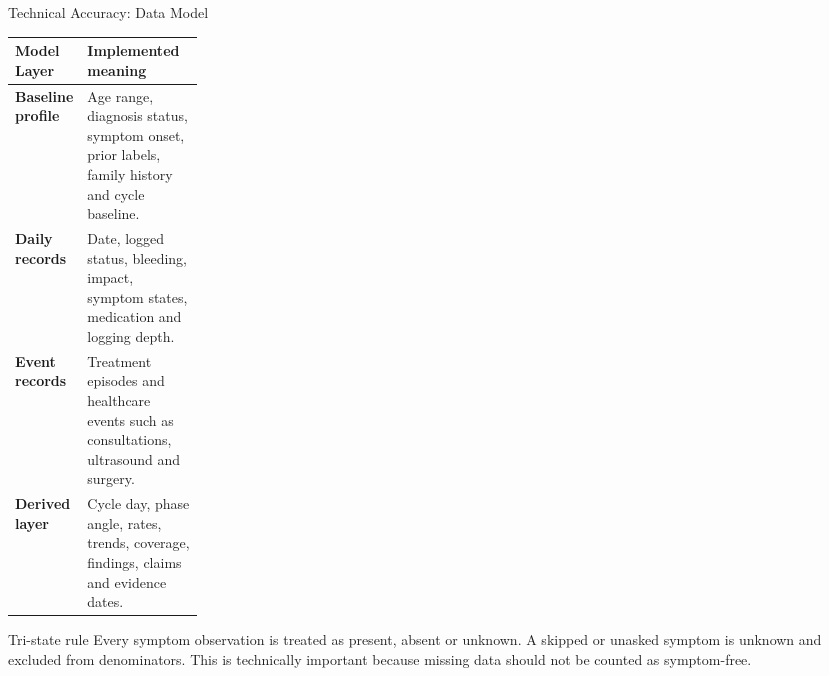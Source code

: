 \documentclass[aspectratio=169,11pt]{beamer}
\begin{document}
\begin{frame}{Technical Accuracy: Data Model}
  \small
  \begin{tabularx}{\linewidth}{>{\bfseries}p{0.22\linewidth} X}
    \toprule
    Model Layer & Implemented meaning \\
    \midrule
    Baseline profile & Age range, diagnosis status, symptom onset, prior labels, family history and cycle baseline. \\
    Daily records & Date, logged status, bleeding, impact, symptom states, medication and logging depth. \\
    Event records & Treatment episodes and healthcare events such as consultations, ultrasound and surgery. \\
    Derived layer & Cycle day, phase angle, rates, trends, coverage, findings, claims and evidence dates. \\
    \bottomrule
  \end{tabularx}

  \vspace{4mm}
  \begin{block}{Tri-state rule}
    Every symptom observation is treated as present, absent or unknown. A skipped or unasked symptom is unknown and excluded from denominators. This is technically important because missing data should not be counted as symptom-free.
  \end{block}
\end{frame}
\end{document}
